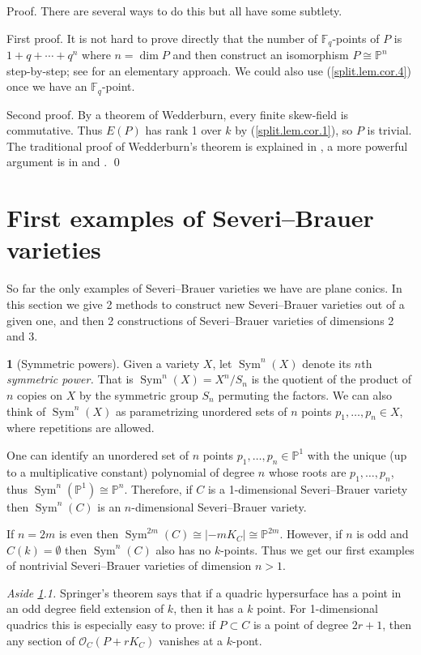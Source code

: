 \documentclass{amsart}
\theoremstyle{definition}
\newtheorem{say}[thm]{}
\theoremstyle{remark}
\renewcommand{\o}[0]{{\mathcal O}}
\newcommand{\p}[0]{{\mathbb P}}
\newcommand{\f}[0]{{\mathbb F}}
\newcommand{\sym}[0]{\operatorname{Sym}}
\begin{document}
Proof. There are several ways to do this but all have some subtlety.


First proof. It is not hard to prove directly that the number of $\f_q$-points of $P$
is  $1+q+\cdots +q^n$ where $n=\dim P$ and then 
construct an isomorphism $P\cong \p^n$ step-by-step;
see \cite[1.23--26]{ksc} for an elementary approach. 
We could also  use 
(\ref{split.lem.cor.4}) once we have an $\f_q$-point.

Second proof. 
By a theorem of Wedderburn, every finite skew-field is commutative.
Thus  $E(P)$ has rank 1 over $k$ by (\ref{split.lem.cor.1}), so $P$ is trivial. 
The traditional  proof of Wedderburn's theorem is explained in
\cite[Sec.7.2]{MR0171801}, a more powerful argument is in
\cite[Sec.X.7]{MR554237} and \cite[Sec.6.2]{MR2266528}.
\qed



\medskip



\section{First examples  of Severi--Brauer varieties}\label{sec.1.b}


So far the only examples of Severi--Brauer varieties we have are plane conics.
In this section we give 2 methods to construct  new
Severi--Brauer varieties out of a given one, and then 2 constructions of  Severi--Brauer varieties of dimensions 2 and 3.

\begin{say}[Symmetric powers]\label{sym.poerr.defn.1}
Given a variety $X$, let $\sym^n(X)$ denote its $n$th
{\it symmetric power.} That is $\sym^n(X)=X^n/S_n$ is the quotient of the product of $n$ copies on $X$ by the symmetric group $S_n$ permuting the factors.
We can also think of $\sym^n(X)$ as  parametrizing unordered sets of $n$ points
$p_1,\dots, p_n\in X$,  where repetitions are allowed.

One can identify an  unordered set of $n$ points
$p_1,\dots, p_n\in \p^1$ with the unique (up to a multiplicative constant) polynomial of degree $n$ whose roots are $p_1,\dots, p_n$, thus 
 $\sym^n(\p^1)\cong \p^{n}$.
Therefore,  if $C$ is a 1-dimensional
Severi--Brauer variety then $\sym^n(C)$  is an $n$-dimensional
Severi--Brauer variety. 

If $n=2m$ is even then  
$ \sym^{2m}(C) \cong |-mK_C|\cong \p^{2m}$. However,  if $n$ is odd 
and $C(k)=\emptyset$ then $\sym^n(C)$ also has no $k$-points.
Thus 
we get our first examples of  nontrivial  Severi--Brauer varieties of dimension $n>1$.

\smallskip
{\it Aside \ref{sym.poerr.defn.1}.1.} Springer's theorem  says that if a quadric
hypersurface has a point in an odd degree field extension of $k$, then it has a
$k$ point. For 1-dimensional quadrics this is especially easy to prove:
if $P\subset C$ is a point of degree $2r+1$, then any section of
$\o_C(P+rK_C)$ vanishes at a $k$-pont. 
\end{say}
\end{document}
